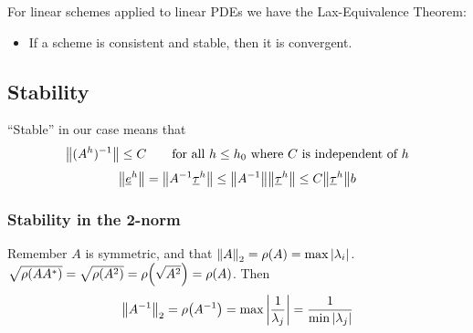 \documentclass{article}
\begin{document}
            For linear schemes applied to linear PDEs we have the Lax-Equivalence Theorem:
            \begin{itemize}
                \item If a scheme is consistent and stable, then it is convergent.
            \end{itemize}
        \subsection{Stability}
            ``Stable'' in our case means that
            \begin{align}
                \norm{(A^h)^{-1}} \leq C \qquad \text{for all } h \leq h_0 \text{ where $C$ is independent of $h$}
            \end{align}
            \begin{align}
                \norm{\underline{e}^h} = \norm{A^{-1}\underline{\tau}^h} \leq \norm{A^{-1}}\norm{\underline{\tau}^h} \leq C\norm{\underline{\tau}^h}b
            \end{align}
            \subsubsection{Stability in the 2-norm}
                Remember $A$ is symmetric, and that $\norm{A}_2 = \rho(A) = \max\abs{\lambda_i}$.  $\sqrt{\rho\qty(AA^*)} = \sqrt{\rho\qty(A^2)} = \rho\qty(\sqrt{A^2}) = \rho(A)$.  Then
                \begin{align}
                    \norm{A^{-1}}_2 = \rho\qty(A^{-1}) = \max\abs{\frac{1}{\lambda_j}} = \frac{1}{\min\abs{\lambda_j}}
                \end{align}
\end{document}
